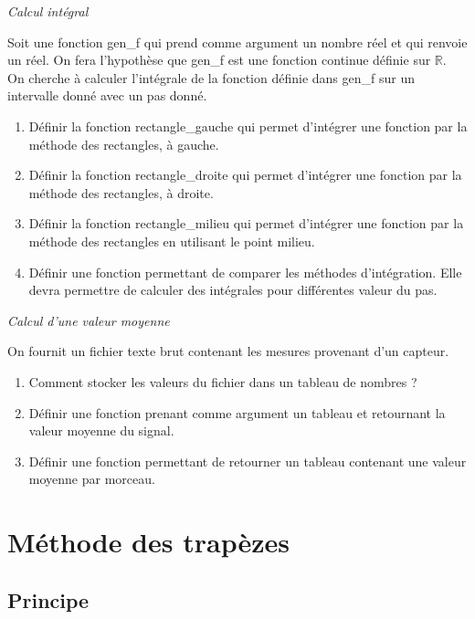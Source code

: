\documentclass[10pt]{article}
\begin{document}
\begin{exemple}
\textit{Calcul intégral}

Soit une fonction \textsf{gen\_f} qui prend comme argument un nombre réel et qui renvoie un réel. On fera l'hypothèse que \textsf{gen\_f} est une fonction continue définie sur $\mathbb{R}$. On cherche à calculer l'intégrale de la fonction définie dans \textsf{gen\_f} sur un intervalle donné avec un pas donné. 

\begin{enumerate}
\item Définir la fonction \textsf{rectangle\_gauche} qui permet d'intégrer une fonction par la méthode des rectangles, à gauche.
\item Définir la fonction \textsf{rectangle\_droite} qui permet d'intégrer une fonction par la méthode des rectangles, à droite.
\item Définir la fonction \textsf{rectangle\_milieu} qui permet d'intégrer une fonction par la méthode des rectangles en utilisant le point milieu.
\item Définir une fonction permettant de comparer les méthodes d'intégration. Elle devra permettre de calculer des intégrales pour différentes valeur du pas. 
\end{enumerate}
\end{exemple}

\begin{exemple}
\textit{Calcul d'une valeur moyenne}

On fournit un fichier texte brut contenant les mesures provenant d'un capteur. 
\begin{enumerate}
\item Comment stocker les valeurs du fichier dans un tableau de nombres ?
\item Définir une fonction prenant comme argument un tableau et retournant la valeur moyenne du signal. 
\item Définir une fonction permettant de retourner un tableau contenant une valeur moyenne par morceau.
\end{enumerate}

\end{exemple}

  
\section{Méthode des trapèzes}
\subsection{Principe}
\end{document}
